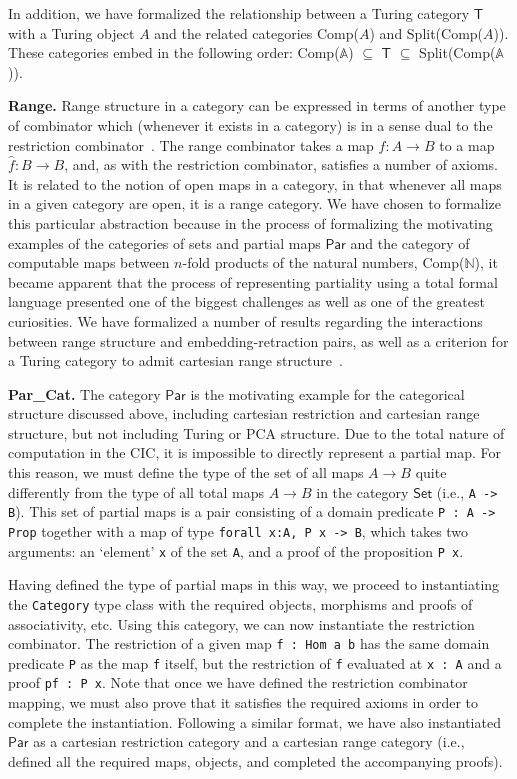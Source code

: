 \documentclass{entcs} \usepackage{entcsmacro}
\begin{document}
In addition, we have formalized the relationship between a Turing category $\mathsf{T}$ with a Turing object $A$ and the related categories Comp($A$) and Split(Comp($A$)). These categories embed in the following order:
Comp($\mathbb{A}$) $\subseteq$ $\mathsf{T}$ $\subseteq$ Split(Comp($\mathbb{A}$)).

{\bfseries Range.} Range structure in a category can be expressed in terms of another type of combinator which (whenever it exists in a category) is in a sense dual to the restriction combinator~\cite{RangeI}. The range combinator takes a map $f : A \to B$ to a map $\hat{f} : B \to B$, and, as with the restriction combinator, satisfies a number of axioms. It is related to the notion of open maps in a category, in that whenever all maps in a given category are open, it is a range category. We have chosen to formalize this particular abstraction because in the process of formalizing the motivating examples of the categories of sets and partial maps $\mathsf{Par}$ and the category of computable maps between $n$-fold products of the natural numbers, Comp($\mathbb{N}$), it became apparent that the process of representing partiality using a total formal language presented one of the biggest challenges as well as one of the greatest curiosities. We have formalized a number of results regarding the interactions between range structure and embedding-retraction pairs, as well as a criterion for a Turing category to admit cartesian range structure~\cite{MyThesis}.

{\bfseries Par\_Cat.} The category $\mathsf{Par}$ is the motivating example for the categorical structure discussed above, including cartesian restriction and cartesian range structure, but not including Turing or PCA structure. Due to the total nature of computation in the CIC, it is impossible to directly represent a partial map. For this reason, we must define the type of the set of all maps $A \to B$ quite differently from the type of all total maps $A \to B$ in the category $\mathsf{Set}$ (i.e., {\tt A -> B}). This set of partial maps is a pair consisting of a domain predicate {\tt P : A -> Prop} together with a map of type {\tt forall x:A, P x -> B}, which takes two arguments: an `element' {\tt x} of the set {\tt A}, and a proof of the proposition {\tt P x}. 

Having defined the type of partial maps in this way, we proceed to instantiating the {\tt Category} type class with the required objects, morphisms and proofs of associativity, etc. Using this category, we can now instantiate the restriction combinator. The restriction of a given map {\tt f : Hom a b} has the same domain predicate {\tt P} as the map {\tt f} itself, but the restriction of {\tt f} evaluated at {\tt x : A} and a proof {\tt pf : P x}. Note that once we have defined the restriction combinator mapping, we must also prove that it satisfies the required axioms in order to complete the instantiation. Following a similar format, we have also instantiated $\mathsf{Par}$ as a cartesian restriction category and a cartesian range category (i.e., defined all the required maps, objects, and completed the accompanying proofs).
\end{document}
